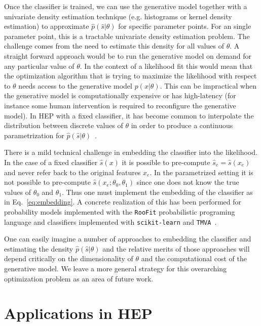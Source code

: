 \documentclass[12pt]{article}
\numberwithin{equation}{section}
\theoremstyle{plain}
\begin{document}
Once the classifier is trained, we can use the generative model together with a univariate density estimation technique (e.g. histograms or kernel density estimation) to approximate $\hat{p}(\hat{s}|\theta)$ for specific parameter points.
For an single parameter point, this is a tractable univariate density estimation problem. The challenge comes from the need to estimate this density for all values of $\theta$.
A straight forward approach would be to run the generative model on demand for any particular value of $\theta$.
In the context of a likelihood fit this would mean that the optimization algorithm that is trying to maximize the likelihood with respect to $\theta$ needs access to the generative model $p(x|\theta)$. This can be  impractical when the generative model is computationally expensive or has high-latency (for instance some human intervention is required to reconfigure the generative model).  In  HEP with a fixed classifier, it has become common  to interpolate the distribution between discrete values of $\theta$ in order to produce a continuous parametrization for $\hat p(\hat s | \theta)$~\citep{Cranmer:2012sba}.

There is a mild technical challenge in embedding the classifier into the likelihood. In the case of a fixed classifier $\hat s(x)$ it is possible to pre-compute $\hat s_e=\hat s(x_e)$ and never refer back to the original features $x_e$. In the parametrized setting it is not possible to pre-compute $\hat s(x_e; \theta_0, \theta_1)$ since one does not know the true values of  $\theta_0$ and $\theta_1$. Thus one must implement the embedding of the classifier as in Eq.~\ref{eq:embedding}.  A concrete realization of this has been performed for probability models implemented with the \texttt{RooFit} probabilistic programing language and  classifiers implemented with \texttt{scikit-learn} and \texttt{TMVA}~\citep{Verkerke:2003ir,scikit-learn,Hocker:2007ht}.


One can easily imagine a number of approaches to embedding the classifier and estimating the density $\hat p(\hat s|\theta)$ and the relative merits of those approaches will depend critically on the dimensionality of $\theta$ and the computational cost of the generative model. We leave a more general strategy for this overarching optimization problem as an area of future work.

\section{Applications in HEP}
\end{document}
